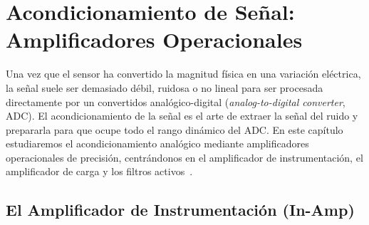 
\chapter{Acondicionamiento de Señal: Amplificadores Operacionales}\label{cap:opamps}

Una vez que el sensor ha convertido la magnitud física en una variación eléctrica, la señal suele ser demasiado débil, ruidosa o no lineal para ser procesada directamente por un convertidos analógico-digital (\emph{analog-to-digital converter}, ADC). El acondicionamiento de la señal es el arte de extraer la señal del ruido y prepararla para que ocupe todo el rango dinámico del ADC. En este capítulo estudiaremos el acondicionamiento analógico mediante amplificadores operacionales de precisión, centrándonos en el amplificador de instrumentación, el amplificador de carga y los filtros activos~\cite{franco2015opamps}.

\section{El Amplificador de Instrumentación (In-Amp)}\label{sec:inamp}

